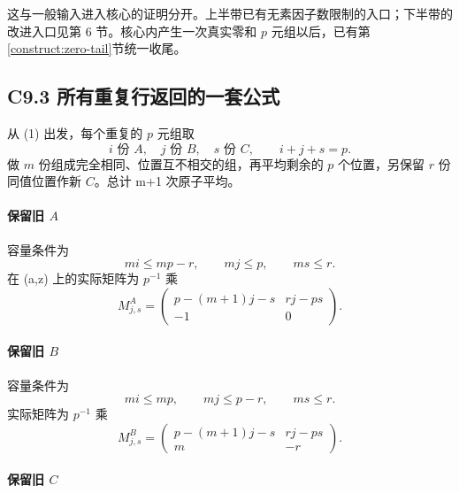 {这与一般输入进入核心的证明分开。上半带已有无素因子数限制的入口；下半带的改进入口见第} {6} {节。核心内产生一次真实零和} {\ensuremath{p}} {元组以后，已有}第\ref{construct:zero-tail}节{统一收尾。}

\subsection*{\texorpdfstring{{C9.3} {所有重复行返回的一套公式}}{C9.3 所有重复行返回的一套公式}}\label{C9-h60}

{从} {(1)} {出发，每个重复的} {\ensuremath{p}} {元组取} \[
i\text{ 份 }A,\quad j\text{ 份 }B,\quad s\text{ 份 }C,
\qquad i+j+s=p.
\] {做} {\ensuremath{m}} {份组成完全相同、位置互不相交的组，再平均剩余的} {\ensuremath{p}} {个位置，另保留} {\ensuremath{r}} {份同值位置作新} {\ensuremath{C}。总计} {m+1} {次原子平均。}

\paragraph*{\texorpdfstring{{保留旧} {\ensuremath{A}}}{保留旧 }}\label{C9-h61}

{容量条件为} \[
mi\le mp-r,\qquad mj\le p,\qquad ms\le r.
\] {在} {(a,z)} {上的实际矩阵为} {\ensuremath{p^{-1}}} {乘} \[
\boxed{M^A_{j,s}=
\begin{pmatrix}
p-(m+1)j-s&rj-ps\\
-1&0
\end{pmatrix}.}
\tag{C9.5}
\]

\paragraph*{\texorpdfstring{{保留旧} {\ensuremath{B}}}{保留旧 }}\label{C9-h62}

{容量条件为} \[
mi\le mp,\qquad mj\le p-r,\qquad ms\le r.
\] {实际矩阵为} {\ensuremath{p^{-1}}} {乘} \[
\boxed{M^B_{j,s}=
\begin{pmatrix}
p-(m+1)j-s&rj-ps\\
m&-r
\end{pmatrix}.}
\tag{C9.6}
\]

\paragraph*{\texorpdfstring{{保留旧} {\ensuremath{C}}}{保留旧 }}\label{C9-h63}

